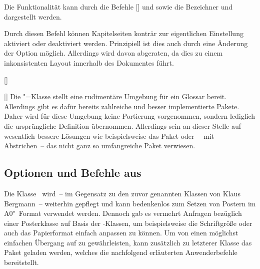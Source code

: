 \begin{Bundle*}{}
\begin{Declaration}{}
\printdeclarationlist%
%
Die Funktionalität kann durch die Befehle [] 
und  sowie die Bezeichner  und 
 dargestellt werden.
\end{Declaration}

\begin{Declaration}{}
\printdeclarationlist%
%
Durch diesen Befehl können Kapitelseiten konträr zur eigentlichen Einstellung 
aktiviert oder deaktiviert werden. Prinzipiell ist dies auch durch eine 
Änderung der Option  möglich. Allerdings wird davon 
abgeraten, da dies zu einem inkonsistenten Layout innerhalb des Dokumentes 
führt.
\end{Declaration}

\begin{Declaration}{[]}
\begin{Declaration}{[]}
\printdeclarationlist%
%
Die "=Klasse stellt eine rudimentäre Umgebung für ein Glossar 
bereit. Allerdings gibt es dafür bereits zahlreiche und besser implementierte 
Pakete. Daher wird für diese Umgebung keine Portierung vorgenommen, sondern 
lediglich die ursprüngliche Definition übernommen. Allerdings sein an dieser 
Stelle auf wesentlich bessere Lösungen wie beispielsweise das Paket 
 oder~-- mit Abstrichen~-- das nicht ganz so umfangreiche 
Paket  verwiesen.
\end{Declaration}
\end{Declaration}
%

\subsection{Optionen und Befehle aus }
%
%
Die Klasse~ wird~-- im Gegensatz zu den zuvor genannten 
Klassen von Klaus Bergmann~-- weiterhin gepflegt und kann bedenkenlos zum 
Setzen von Postern im A0"~Format verwendet werden. Dennoch gab es vermehrt 
Anfragen bezüglich einer Posterklasse auf Basis der \TUDScript-Klassen, um 
beispielsweise die Schriftgröße oder auch das Papierformat einfach anpassen zu 
können. Um von  einen möglichst einfachen Übergang auf 
 zu gewährleisten, kann zusätzlich zu letzterer Klasse das 
Paket  geladen werden, welches die nachfolgend erläuterten 
Anwenderbefehle bereitstellt.


\end{Bundle*}
